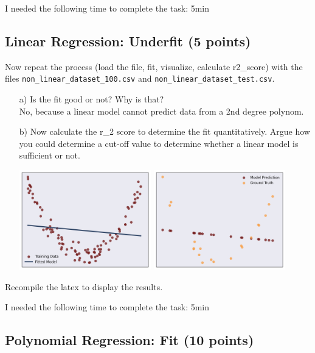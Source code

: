 I needed the following time to complete the task: 5min

\subsection{Linear Regression: Underfit (5 points)}

Now repeat the process (load the file, fit, visualize, calculate r2\_score) with the files \texttt{non\_linear\_dataset\_100.csv} and \texttt{non\_linear\_dataset\_test.csv}.

\begin{enumerate}

\item[a)] Is the fit good or not? Why is that? \\
No, because a linear model cannot predict data from a 2nd degree polynom.

\item[b)] Now calculate the r\_2 score to determine the fit quantitatively. Argue how you could determine a cut-off value to determine whether a linear model is sufficient or not.

\includegraphics[width=0.45\textwidth]{source_code/underfit_linear_model.png}
\includegraphics[width=0.45\textwidth]{source_code/underfit_linear_testdata.png}

\end{enumerate}

Recompile the latex to display the results.

I needed the following time to complete the task: 5min

\subsection{Polynomial Regression: Fit (10 points)}

